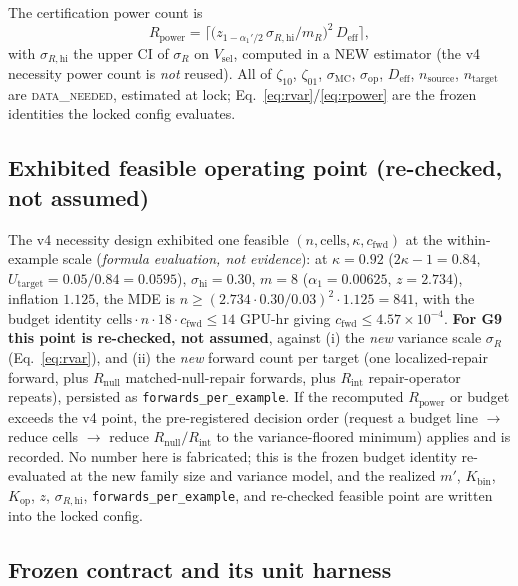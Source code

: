 \documentclass[11pt]{article}
\theoremstyle{plain}
\theoremstyle{definition}
\newcommand{\sR}{\sigma_{R}}
\begin{document}
The certification power count is
\begin{equation}
R_{\mathrm{power}} = \Big\lceil\big(z_{1-\alpha_1'/2}\,\sigma_{R,\mathrm{hi}}/m_R\big)^2\,D_{\mathrm{eff}}\Big\rceil,
\label{eq:rpower}
\end{equation}
with $\sigma_{R,\mathrm{hi}}$ the upper CI of $\sR$ on $V_{\mathrm{sel}}$, computed in
a NEW estimator (the v4 necessity power count is \emph{not} reused). All of
$\zeta_{10}$, $\zeta_{01}$, $\sigma_{\mathrm{MC}}$, $\sigma_{\mathrm{op}}$,
$D_{\mathrm{eff}}$, $n_{\mathrm{source}}$, $n_{\mathrm{target}}$ are
\textsc{data\_needed}, estimated at lock; Eq.~\ref{eq:rvar}/\ref{eq:rpower} are the
frozen identities the locked config evaluates.

\subsection{Exhibited feasible operating point (re-checked, not assumed)}\label{sec:setup:feasible}

The v4 necessity design exhibited one feasible
$(n,\text{cells},\kappa,c_{\mathrm{fwd}})$ at the within-example scale
(\emph{formula evaluation, not evidence}): at $\kappa=0.92$
($2\kappa-1=0.84$, $U_{\mathrm{target}}=0.05/0.84=0.0595$), $\sigma_{\mathrm{hi}}=0.30$,
$m=8$ ($\alpha_1=0.00625$, $z=2.734$), inflation $1.125$, the MDE is
$n\ge(2.734\cdot0.30/0.03)^2\cdot1.125=841$, with the budget identity
$\text{cells}\cdot n\cdot 18\cdot c_{\mathrm{fwd}}\le14$ GPU-hr giving
$c_{\mathrm{fwd}}\le4.57\times10^{-4}$. \textbf{For G9 this point is re-checked, not
assumed}, against (i) the \emph{new} variance scale $\sR$ (Eq.~\ref{eq:rvar}), and
(ii) the \emph{new} forward count per target (one localized-repair forward, plus
$R_{\mathrm{null}}$ matched-null-repair forwards, plus $R_{\mathrm{int}}$
repair-operator repeats), persisted as \texttt{forwards\_per\_example}. If the
recomputed $R_{\mathrm{power}}$ or budget exceeds the v4 point, the pre-registered
decision order (request a budget line $\to$ reduce cells $\to$ reduce
$R_{\mathrm{null}}/R_{\mathrm{int}}$ to the variance-floored minimum) applies and is
recorded. No number here is fabricated; this is the frozen budget identity
re-evaluated at the new family size and variance model, and the realized $m'$,
$K_{\mathrm{bin}}$, $K_{\mathrm{op}}$, $z$, $\sigma_{R,\mathrm{hi}}$,
\texttt{forwards\_per\_example}, and re-checked feasible point are written into the
locked config.

\subsection{Frozen contract and its unit harness}\label{sec:setup:harness}
\end{document}
